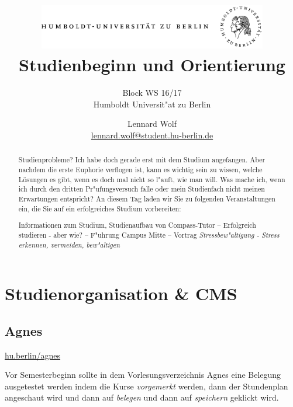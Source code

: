 \documentclass[]{scrartcl}
\begin{document}
\title{
	\includegraphics*[width=0.75\textwidth]{images/hu_logo.png}\\
	\vspace{24pt}
	Studienbeginn und Orientierung}
\subtitle{Block WS 16/17\\
          Humboldt Universit"at zu Berlin}
\author{Lennard Wolf\\
        \href{mailto:lennard.wolf@student.hu-berlin.de}{lennard.wolf@student.hu-berlin.de}}
\maketitle
\begin{abstract}

Studienprobleme? Ich habe doch gerade erst mit dem Studium angefangen. Aber nachdem die erste Euphorie verflogen ist, kann es wichtig sein zu wissen, welche Lösungen es gibt, wenn es doch mal nicht so l"auft, wie man will. Was mache ich, wenn ich durch den dritten Pr"ufungsversuch falle oder mein Studienfach nicht meinen Erwartungen entspricht? An diesem Tag laden wir Sie zu folgenden Veranstaltungen ein, die Sie auf ein erfolgreiches Studium vorbereiten:

Informationen zum Studium, Studienaufbau von Compass-Tutor -- Erfolgreich studieren - aber wie? -- F"uhrung Campus Mitte -- Vortrag \emph{Stressbew"altigung - Stress erkennen, vermeiden, bew"altigen}

\end{abstract}
\newpage

\tableofcontents
\newpage

\section{Studienorganisation \& CMS}

\subsection{Agnes}
\url{hu.berlin/agnes}
\newline

Vor Semesterbeginn sollte in dem Vorlesungsverzeichnis Agnes eine Belegung ausgetestet werden indem die Kurse \emph{vorgemerkt} werden, dann der Stundenplan angeschaut wird und dann auf \emph{belegen} und dann auf \emph{speichern} geklickt wird.
\end{document}
